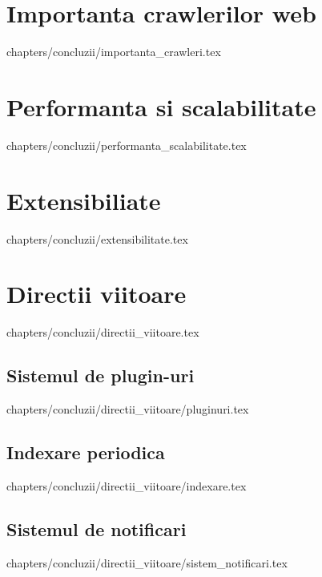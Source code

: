 \documentclass[12pt,oneside]{report}
\begin{document}
\section{Importanta crawlerilor web}
 {
	chapters/concluzii/importanta_crawleri.tex
}

\section{Performanta si scalabilitate}
 {
	chapters/concluzii/performanta_scalabilitate.tex
}
\clearpage

\section{Extensibiliate}
 {
	chapters/concluzii/extensibilitate.tex
}

\section{Directii viitoare}
 {
	chapters/concluzii/directii_viitoare.tex
}

\subsection{Sistemul de plugin-uri}
 {
	chapters/concluzii/directii_viitoare/pluginuri.tex
}

\subsection{Indexare periodica}
 {
	chapters/concluzii/directii_viitoare/indexare.tex
}

\subsection{Sistemul de notificari}
 {
	chapters/concluzii/directii_viitoare/sistem_notificari.tex
}

\clearpage


\end{document}
